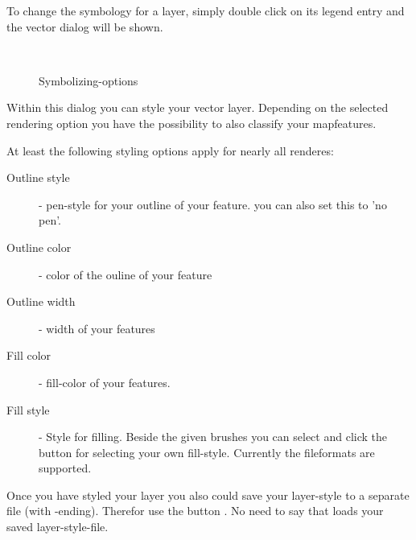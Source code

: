 To change the symbology for a layer, simply double click on its legend 
entry and the vector  dialog will be 
shown.

\begin{figure}[h]
\centering
\caption{Symbolizing-options}
   \goodgap
   \\
   \goodgap
\end{figure}


 \label{sec:style_options} 
Within this dialog you can style your vector layer. Depending on the selected
rendering option you have the possibility to also classify your mapfeatures.

At least the following styling options apply for nearly all renderes:
\begin{description}
 \item[Outline style] - pen-style for your outline of your feature. you can
 also set this to 'no pen'.
 \item[Outline color] - color of the ouline of your feature
 \item[Outline width] - width of your features
 \item[Fill color] - fill-color of your features.
 \item[Fill style] - Style for filling. Beside the given brushes you can
 select  and click the \browsebutton
 button for selecting your own fill-style. Currently the fileformats
  are supported.
\end{description}

Once you have styled your layer you also could save your layer-style to a
separate file (with -ending).
Therefor use the button . No need to say that
 loads your saved layer-style-file.

